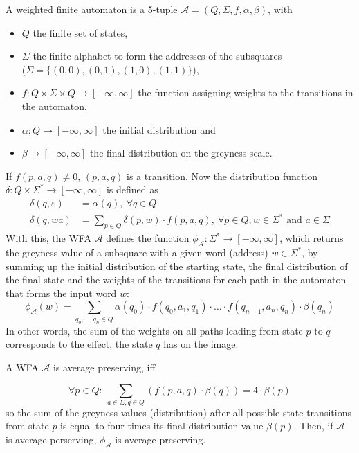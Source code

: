 \documentclass{article}
\begin{document}
A weighted finite automaton is a 5-tuple $\mathcal{A}= (Q, \Sigma, f, \alpha, \beta)$, with 
\begin{itemize}
 \item $Q$ the finite set of states,
 \item $\Sigma$ the finite alphabet to form the addresses of the subsquares\\($\Sigma = \{(0,0), (0,1),(1,0),(1,1)\}$),
 \item $f: Q \times \Sigma \times Q \rightarrow [-\infty, \infty]$ the function assigning weights to the transitions in the automaton,
 \item $\alpha: Q \rightarrow [-\infty, \infty]$ the initial distribution and
 \item $\beta \rightarrow [-\infty, \infty]$ the final distribution on the greyness scale.
\end{itemize}

If $f(p,a,q) \neq 0$, $(p,a,q)$ is a transition.
Now the distribution function $\delta: Q \times \Sigma^* \rightarrow [-\infty, \infty]$ is defined as 
\begin{align*}
\delta(q,\varepsilon) &= \alpha(q),\ \forall q\in Q \\
\delta(q,wa)&= \sum_{p\in Q} \delta(p,w) \cdot f(p,a,q),\ \forall p\in Q, w\in \Sigma^* \text{ and }a\in \Sigma
\end{align*}
With this, the WFA $\mathcal{A}$ defines the function $\phi_{\mathcal{A}}:\Sigma^* \rightarrow [-\infty, \infty]$, which returns the greyness value of a subsquare with a given word (address) $w \in \Sigma^*$, by summing up the initial distribution of the starting state, the final distribution of the final state and the weights of the transitions for each path in the automaton that forms the input word $w$:
$$\phi_{\mathcal{A}}(w) = \sum_{q_0,\dots,q_n \in Q} \alpha(q_0) \cdot f(q_0,a_1,q_1) \cdot \dots \cdot f(q_{n-1}, a_n, q_n ) \cdot \beta(q_n)$$
In other words, the sum of the weights on all paths leading from state $p$ to $q$ corresponds to the effect, the state $q$ has on the image.

A WFA $\mathcal{A}$ is average preserving, iff 

$$\forall p \in Q:\ \sum_{a\in \Sigma, q\in Q} (f(p,a,q) \cdot \beta(q)) = 4 \cdot \beta(p)$$
so the sum of the greyness values (distribution) after all possible state transitions from state $p$ is equal to four times its final distribution value $\beta(p)$. Then, if $\mathcal{A}$ is average perserving, $\phi_{\mathcal A}$ is average preserving.
\end{document}
